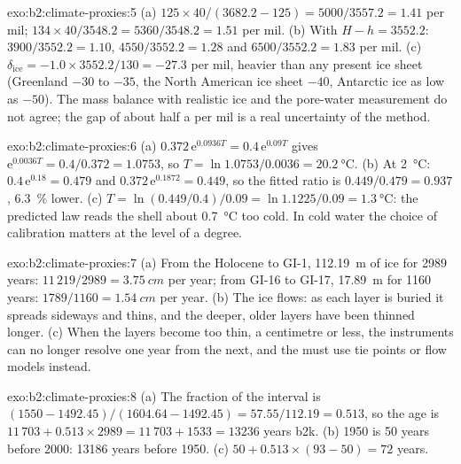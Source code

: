 \begin{solution}{exo:b2:climate-proxies:5}
(a) $125 \times 40/(3682.2 - 125) = 5000/3557.2 = 1.41$ per mil; $134 \times 40/3548.2 =
5360/3548.2 = 1.51$ per mil. (b) With $H - h = 3552.2$: $3900/3552.2 = 1.10$, $4550/3552.2 = 1.28$
and $6500/3552.2 = 1.83$ per mil. (c) $\delta_{\mathrm{ice}} = -1.0 \times 3552.2/130 = -27.3$ per
mil, heavier than any present ice sheet (Greenland $-30$ to $-35$, the North American ice sheet
$-40$, Antarctic ice as low as $-50$). The mass balance with realistic ice and the pore-water
measurement do not agree; the gap of about half a per mil is a real uncertainty of the method.
\end{solution}

\begin{solution}{exo:b2:climate-proxies:6}
(a) $0.372\,\mathrm{e}^{0.0936T} = 0.4\,\mathrm{e}^{0.09T}$ gives $\mathrm{e}^{0.0036T} =
0.4/0.372 = 1.0753$, so $T = \ln 1.0753/0.0036 = \qty{20.2}{\celsius}$. (b) At
\qty{2}{\celsius}: $0.4\,\mathrm{e}^{0.18} = 0.479$ and $0.372\,\mathrm{e}^{0.1872} = 0.449$, so the
fitted ratio is $0.449/0.479 = 0.937$, \qty{6.3}{\percent} lower. (c) $T = \ln(0.449/0.4)/0.09 =
\ln 1.1225/0.09 = \qty{1.3}{\celsius}$: the predicted law reads the shell about
\qty{0.7}{\celsius} too cold. In cold water the choice of calibration matters at the level of a
degree.
\end{solution}

\begin{solution}{exo:b2:climate-proxies:7}
(a) From the Holocene to GI-1, \qty{112.19}{m} of ice for 2989 years: $11\,219/2989 =
\qty{3.75}{cm}$ per year; from GI-16 to GI-17, \qty{17.89}{m} for 1160 years: $1789/1160 =
\qty{1.54}{cm}$ per year. (b) The ice
flows: as each layer is buried it spreads sideways and thins, and the deeper, older layers have
been thinned longer. (c) When the layers become too thin, a centimetre or less, the instruments
can no longer resolve one year from the next, and the  must use tie points or flow models
instead.
\end{solution}

\begin{solution}{exo:b2:climate-proxies:8}
(a) The fraction of the interval is $(1550 - 1492.45)/(1604.64 - 1492.45) = 57.55/112.19 = 0.513$,
so the age is $11\,703 + 0.513 \times 2989 = 11\,703 + 1533 = \num{13236}$ years b2k. (b) 1950 is 50
years before 2000: \num{13186} years before 1950. (c) $50 + 0.513 \times (93 - 50) = 72$ years.
\end{solution}

